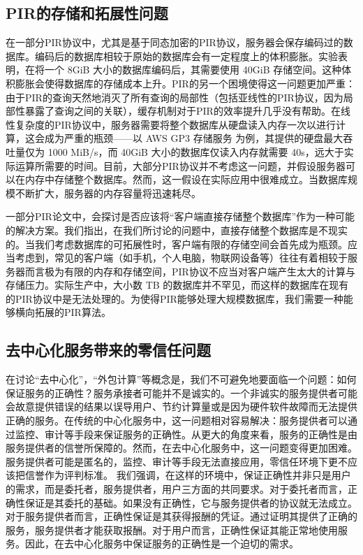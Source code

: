 \subsection{PIR的存储和拓展性问题}
在一部分PIR协议中，尤其是基于同态加密的PIR协议，服务器会保存编码过的数据库。编码后的数据库相较于原始的数据库会有一定程度上的体积膨胀。实验表明，在将一个 8GiB 大小的数据库编码后，其需要使用 40GiB 存储空间\cite{SimplePIR}。这种体积膨胀会使得数据库的存储成本上升。PIR的另一个困境使得这一问题更加严重：由于PIR的查询天然地消灭了所有查询的局部性（包括亚线性的PIR协议，因为局部性暴露了查询之间的关联），缓存机制对于PIR的效率提升几乎没有帮助。在线性复杂度的PIR协议中，服务器需要将整个数据库从硬盘读入内存一次以进行计算，这会成为严重的瓶颈——以 AWS GP3 存储服务 \cite{AWSEBSGP} 为例，其提供的硬盘最大吞吐量仅为 1000 MiB/s，而 40GiB 大小的数据库仅读入内存就需要 40s，远大于实际运算所需要的时间。目前，大部分PIR协议并不考虑这一问题，并假设服务器可以在内存中存储整个数据库。然而，这一假设在实际应用中很难成立。当数据库规模不断扩大，服务器的内存容量将迅速耗尽。

一部分PIR论文中，会探讨是否应该将“客户端直接存储整个数据库”作为一种可能的解决方案。我们指出，在我们所讨论的问题中，直接存储整个数据库是不现实的。当我们考虑数据库的可拓展性时，客户端有限的存储空间会首先成为瓶颈。应当考虑到，常见的客户端（如手机，个人电脑，物联网设备等）往往有着相较于服务器而言极为有限的内存和存储空间，PIR协议不应当对客户端产生太大的计算与存储压力。实际生产中，大小数 TB 的数据库并不罕见，而这样的数据库在现有的PIR协议中是无法处理的。为使得PIR能够处理大规模数据库，我们需要一种能够横向拓展的PIR算法。

\subsection{去中心化服务带来的零信任问题}
在讨论“去中心化”，“外包计算”等概念是，我们不可避免地要面临一个问题：如何保证服务的正确性？服务承接者可能并不是诚实的。一个非诚实的服务提供者可能会故意提供错误的结果以误导用户、节约计算量或是因为硬件软件故障而无法提供正确的服务。在传统的中心化服务中，这一问题相对容易解决：服务提供者可以通过监控、审计等手段来保证服务的正确性。从更大的角度来看，服务的正确性是由服务提供者的信誉所保障的。然而，在去中心化服务中，这一问题变得更加困难。服务提供者可能是匿名的，监控、审计等手段无法直接应用，零信任环境下更不应该把信誉作为评判标准。
我们强调，在这样的环境中，保证正确性并非只是用户的需求，而是委托者，服务提供者，用户三方面的共同要求。对于委托者而言，正确性保证是其委托的基础。如果没有正确性，它与服务提供者的协议就无法成立。对于服务提供者而言，正确性保证是其获得报酬的凭证。通过证明其提供了正确的服务，服务提供者才能获取报酬。对于用户而言，正确性保证其能正常地使用服务。因此，在去中心化服务中保证服务的正确性是一个迫切的需求。

